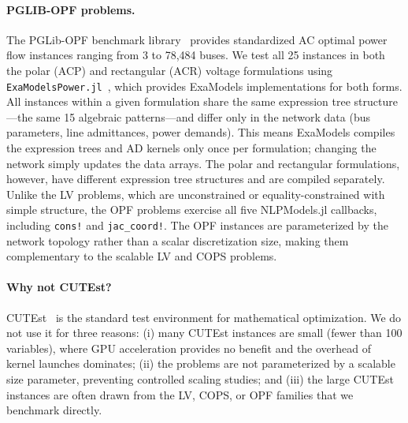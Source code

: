 \documentclass[11pt]{article}
\begin{document}
\paragraph{PGLIB-OPF problems.}
The PGLib-OPF benchmark library~\citep{babaeinejadsarookolaeePowerGridLibrary2021} provides standardized AC optimal power flow instances ranging from 3 to 78{,}484 buses. We test all 25 instances in both the polar (ACP) and rectangular (ACR) voltage formulations using \texttt{ExaModelsPower.jl}~\citep{shinExaModelsPowerjl2024}, which provides ExaModels implementations for both forms. All instances within a given formulation share the same expression tree structure---the same 15 algebraic patterns---and differ only in the network data (bus parameters, line admittances, power demands). This means ExaModels compiles the expression trees and AD kernels only once per formulation; changing the network simply updates the data arrays. The polar and rectangular formulations, however, have different expression tree structures and are compiled separately. Unlike the LV problems, which are unconstrained or equality-constrained with simple structure, the OPF problems exercise all five NLPModels.jl callbacks, including \texttt{cons!} and \texttt{jac\_coord!}. The OPF instances are parameterized by the network topology rather than a scalar discretization size, making them complementary to the scalable LV and COPS problems.

\paragraph{Why not CUTEst?}
CUTEst~\citep{gouldCUTEstConstrainedUnconstrained2015} is the standard test environment for mathematical optimization. We do not use it for three reasons: (i) many CUTEst instances are small (fewer than 100 variables), where GPU acceleration provides no benefit and the overhead of kernel launches dominates; (ii) the problems are not parameterized by a scalable size parameter, preventing controlled scaling studies; and (iii) the large CUTEst instances are often drawn from the LV, COPS, or OPF families that we benchmark directly.
\end{document}
